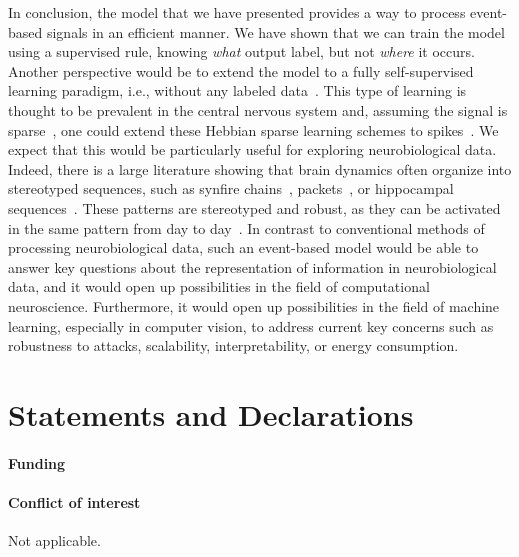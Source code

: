 \documentclass[default]{sn-jnl}%
\theoremstyle{thmstyleone}%
\theoremstyle{thmstyletwo}%
\theoremstyle{thmstylethree}%
\begin{document}
In conclusion, the model that we have presented provides a way to process event-based signals in an efficient manner. We have shown that we can train the model using a supervised rule, knowing \emph{what} output label, but not \emph{where} it occurs. Another perspective would be to extend the model to a fully self-supervised learning paradigm, i.e., without any labeled data~\citep{barlow_unsupervised_1989}. This type of learning is thought to be prevalent in the central nervous system and, assuming the signal is sparse~\citep{olshausen_emergence_1996}, one could extend these Hebbian sparse learning schemes to spikes~\citep{perrinet_emergence_2004, masquelier_competitive_2009}. We expect that this would be particularly useful for exploring neurobiological data. Indeed, there is a large literature showing that brain dynamics often organize into stereotyped sequences, such as synfire chains~\citep{ikegaya_synfire_2004}, packets~\citep{luczak_sequential_2007}, or hippocampal sequences~\citep{pastalkova_internally_2008, villette_internally_2015}. These patterns are stereotyped and robust, as they can be activated in the same pattern from day to day~\citep{haimerl_internal_2019}. In contrast to conventional methods of processing neurobiological data, such an event-based model would be able to answer key questions about the representation of information in neurobiological data, and it would open up possibilities in the field of computational neuroscience. Furthermore, it would open up possibilities in the field of machine learning, especially in computer vision, to address current key concerns such as robustness to attacks, scalability, interpretability, or energy consumption.
%
\backmatter
%
%
\Acknowledgments
%

\section*{Statements and Declarations}

\paragraph{Funding}

\Funding %

\paragraph{Conflict of interest}
Not applicable.
\end{document}
